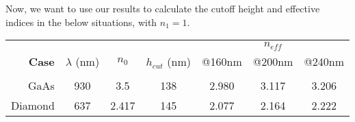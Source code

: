 \documentclass[10pt, letter, oneside,graphicx]{article}
\begin{document}
Now, we want to use our results to calculate the cutoff height and effective indices in the below situations, with $n_1 = 1$.
\begin{center}
\begin{tabular}{rcccccc}
&&&&& $n_{eff}$  \\
\textbf{Case} & $\lambda$ (nm) & $n_0$ & $h_{cut}$ (nm) & @160nm & @200nm & @240nm \\
\hline\\
GaAs 		& 930 	& 3.5	& 138 & 2.980 & 3.117 & 3.206 \\
Diamond 	& 637 	& 2.417 & 145 & 2.077 & 2.164 & 2.222 \\
\end{tabular}
\end{center}


\end{document}
